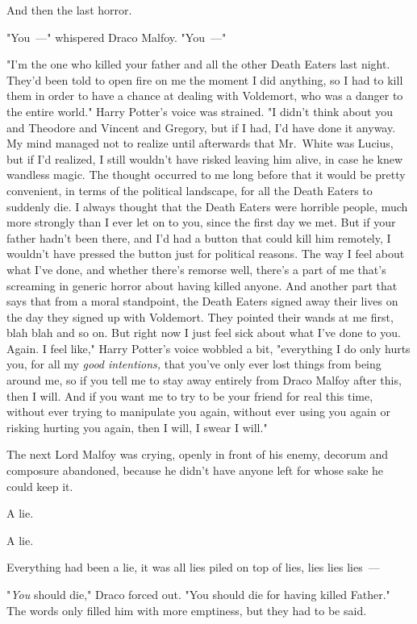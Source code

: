 And then the last horror.

"You~---" whispered Draco Malfoy. "You~---"

"I'm the one who killed your father and all the other Death Eaters last night.
They'd been told to open fire on me the moment I did anything, so I had to kill
them in order to have a chance at dealing with Voldemort, who was a danger to
the entire world." Harry Potter's voice was strained. "I didn't think about you
and Theodore and Vincent and Gregory, but if I had, I'd have done it anyway. My
mind managed not to realize until afterwards that Mr.~White was Lucius, but if
I'd realized, I still wouldn't have risked leaving him alive, in case he knew
wandless magic. The thought occurred to me long before that it would be pretty
convenient, in terms of the political landscape, for all the Death Eaters to
suddenly die. I always thought that the Death Eaters were horrible people, much
more strongly than I ever let on to you, since the first day we met. But if
your father hadn't been there, and I'd had a button that could kill him
remotely, I wouldn't have pressed the button just for political reasons. The
way I feel about what I've done, and whether there's remorse{\el} well,
there's a part of me that's screaming in generic horror about having killed
anyone. And another part that says that from a moral standpoint, the Death
Eaters signed away their lives on the day they signed up with Voldemort. They
pointed their wands at me first, blah blah and so on. But right now I just feel
sick about what I've done to you. Again. I feel like," Harry Potter's voice
wobbled a bit, "everything I do only hurts you, for all my \emph{good
intentions,} that you've only ever lost things from being around me, so if you
tell me to stay away entirely from Draco Malfoy after this, then I will. And if
you want me to try to be your friend for real this time, without ever trying to
manipulate you again, without ever using you again or risking hurting you
again, then I will, I swear I will."

The next Lord Malfoy was crying, openly in front of his enemy, decorum and
composure abandoned, because he didn't have anyone left for whose sake he could
keep it.

A lie.

A lie.

Everything had been a lie, it was all lies piled on top of lies, lies lies
lies~---

"\emph{You} should die," Draco forced out. "You should die for having killed
Father." The words only filled him with more emptiness, but they had to be said.

